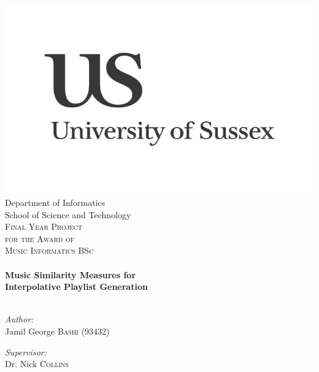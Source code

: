 \begin{titlepage}
\begin{center}
\texttt{}\\
\includegraphics[width=0.5\linewidth]{front/images/us-logo}\\
\small Department of Informatics\\
School of Science and Technology\\[2cm]

\textsc{\Large Final Year Project\\[0.1cm]
\small for the Award of\\[0.2cm]
\Large Music Informatics BSc}\\[1cm]

\hrulefill \\[0.8cm]
{ \huge \bfseries Music Similarity Measures for\\
Interpolative Playlist Generation}\\[0.8cm]

\hrulefill \\[2.5cm]
\begin{minipage}{0.45\textwidth}
\begin{flushleft} \large
\emph{Author:}\\
Jamil George \textsc{Bashi} (93432)
\end{flushleft}
\end{minipage}
\begin{minipage}{0.45\textwidth}
\begin{flushright} \large
\emph{Supervisor:} \\
Dr. Nick \textsc{Collins}
\end{flushright}
\end{minipage}
\vspace{25cm}

\end{center}
\end{titlepage}
